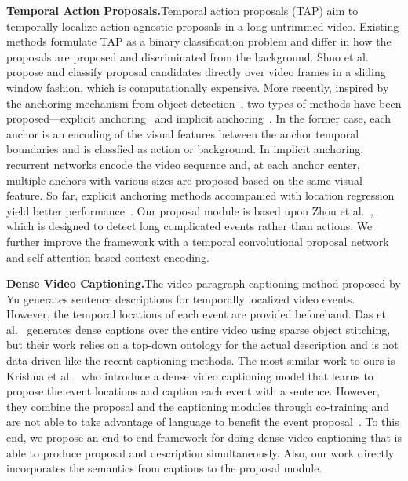 \documentclass[10pt,twocolumn,letterpaper]{article}
\begin{document}
\noindent\textbf{Temporal Action Proposals.}\quad Temporal action proposals (TAP) aim to temporally localize action-agnostic proposals in a long untrimmed video. Existing methods formulate TAP as a binary classification problem and differ in how the proposals are proposed and discriminated from the background. 
Shuo et al.~\cite{shou2016temporal} 
propose and classify proposal candidates directly over video frames in a sliding window fashion, which is computationally expensive. More recently, inspired by the anchoring mechanism from object detection~\cite{ren2015faster}, two types of methods have been proposed---explicit anchoring~\cite{gao2017turn,zhou2017procnets} and implicit anchoring~\cite{escorcia2016daps,buch2017sst}. 
In the former case, each anchor is an encoding of the visual features between the anchor temporal boundaries and is classfied as action or background. In implicit anchoring, recurrent networks encode the video sequence and, at each anchor center, multiple anchors with various sizes are proposed based on the same visual feature. 
So far, explicit anchoring methods accompanied with location regression yield better performance~\cite{gao2017turn}. Our proposal module is based upon Zhou et al.~\cite{zhou2017procnets}, which is designed to detect long complicated events rather than actions. 
We further improve the framework with a temporal convolutional proposal network and self-attention based context encoding.

\noindent\textbf{Dense Video Captioning.}\quad The video paragraph captioning method proposed by Yu \etal \cite{yu2015video} generates sentence descriptions for temporally localized video events. However, the temporal locations of each event are provided beforehand. Das et al.~\cite{das2013thousand} generates dense captions over the entire video using sparse object stitching, but their work relies on a top-down ontology for the actual description and is not data-driven like the recent captioning methods. The most similar work to ours is Krishna et al.~\cite{krishna2017dense} who introduce a dense video captioning model that learns to propose the event locations and caption each event with a sentence.
However, they combine the proposal and the captioning modules through co-training and are not able to take advantage of language to benefit the event proposal~\cite{heilbron2017scc}. To this end, we propose an end-to-end framework for doing dense video captioning that is able to produce proposal and description simultaneously. Also, our work directly incorporates the semantics from captions to the proposal module. 
\end{document}
